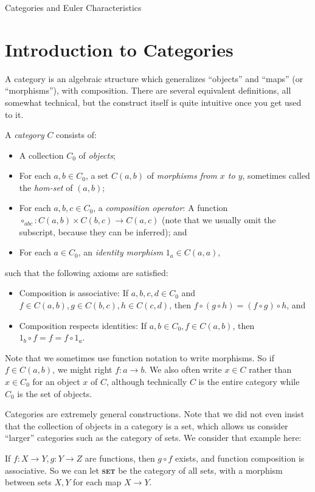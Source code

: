 \documentclass[12pt]{pom_thesis}
\newcommand{\catname}[1]{\textbf{\textsc{#1}}}
\begin{document}
\begin{chapter}{Categories and Euler Characteristics}\label{chap:euler}
\section{Introduction to Categories} \label{cat_defs}

A category is an algebraic structure which generalizes ``objects'' and ``maps'' (or ``morphisms''), with composition. There are several equivalent definitions, all somewhat technical, but the construct itself is quite intuitive once you get used to it.  
\begin{defn}
A \textit{category} $C$ consists of:
\begin{itemize}
\item A collection $C_0$ of \emph{objects};
\item For each $a,b \in C_0$, a set $C(a,b)$ of \emph{morphisms from $x$ to $y$}, sometimes called the \emph{hom-set} of $(a,b)$;
\item For each $a,b,c \in C_0$, a \emph{composition operator}: A function $\circ_{abc} :C(a,b) \times C(b,c) \rightarrow C(a,c)$ (note that we usually omit the subscript, because they can be inferred); and
\item For each $a \in C_0$, an \emph{identity morphism} $1_a \in C(a,a)$,
\end{itemize}
such that the following axioms are satisfied:
\begin{itemize}
\item Composition is associative: If $a,b,c,d \in C_0$ and $f\in C(a,b), g \in C(b,c), h \in C(c,d)$, then $f \circ (g \circ h) = (f \circ g) \circ h$, and
\item Composition respects identities: If $a,b \in C_0, f \in C(a,b)$, then $1_b \circ f = f = f \circ 1_a$.
\end{itemize}
\end{defn}
Note that we sometimes use function notation to write morphisms. So if $f \in C(a,b)$, we might right $f:a \rightarrow b$. We also often write $x \in C$ rather than $x \in C_0$ for an object $x$ of $C$, although technically $C$ is the entire category while $C_0$ is the set of objects.

Categories are extremely general constructions. Note that we did not even insist that the collection of objects in a category is a set, which allows us consider ``larger'' categories such as the category of sets. We consider that example here:
\begin{examp}
If $f:X \rightarrow Y, g:Y\rightarrow Z$ are functions, then $g \circ f$ exists, and function composition is associative. So we can let \catname{set} be the category of all sets, with a morphism between sets $X,Y$ for each map $X \rightarrow Y$. 
\end{examp}


\end{chapter}
\end{document}
